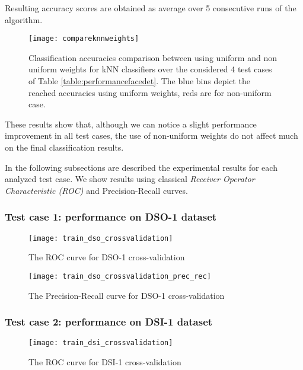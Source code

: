 Resulting accuracy scores are obtained as average over 5 consecutive runs of the algorithm. 

\begin{figure}[h!]
  \centering
    \texttt{[image: compareknnweights]}
    \caption{Classification accuracies comparison between using uniform and non uniform weights for kNN classifiers over the considered 4 test cases of Table \ref{table:performancefacedet}. The blue bins depict the reached accuracies using uniform weights, reds are for non-uniform case.}
    \label{fig:compareknnweights}
\end{figure}

These results show that, although we can notice a slight performance improvement in all test cases, the use of non-uniform weights do not affect much on the final classification results.

In the following subsections are described the experimental results for each analyzed test case. We show results using classical \emph{Receiver Operator Characteristic (ROC)} \cite{fawcett2006introduction} and Precision-Recall curves\cite{Davis:2006:RPR:1143844.1143874}. 

\subsubsection{Test case 1: performance on DSO-1 dataset}


\begin{figure}[h!]
  \centering
    \texttt{[image: train\_dso\_crossvalidation]}
    \caption{The ROC curve  for DSO-1 cross-validation}
    \label{fig:train_dso_crossvalidation}
\end{figure}

\begin{figure}[h!]
  \centering
    \texttt{[image: train\_dso\_crossvalidation\_prec\_rec]}
    \caption{The Precision-Recall curve for DSO-1 cross-validation}
    \label{fig:train_dso_crossvalidation_prec_rec}
\end{figure}

\subsubsection{Test case 2: performance on DSI-1 dataset}

\begin{figure}[h!]
  \centering
    \texttt{[image: train\_dsi\_crossvalidation]}
    \caption{The ROC curve  for DSI-1 cross-validation}
    \label{fig:train_dsi_crossvalidation}
\end{figure}

